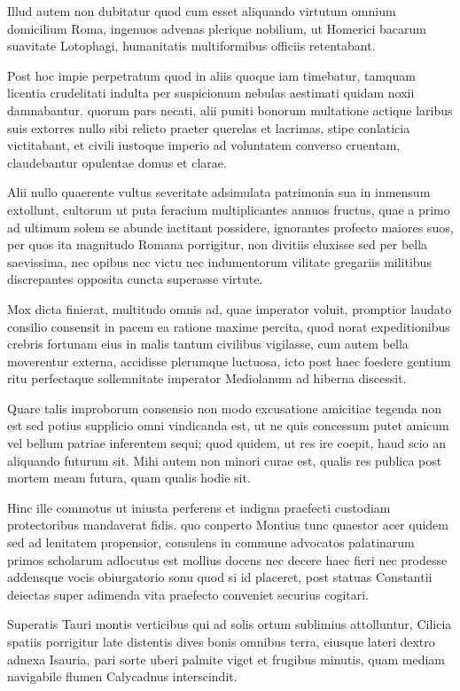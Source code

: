 \documentclass[12pt]{book}
\begin{document}
Illud autem non dubitatur quod cum esset aliquando virtutum omnium domicilium Roma, ingenuos advenas plerique nobilium, ut Homerici bacarum suavitate Lotophagi, humanitatis multiformibus officiis retentabant.

Post hoc impie perpetratum quod in aliis quoque iam timebatur, tamquam licentia crudelitati indulta per suspicionum nebulas aestimati quidam noxii damnabantur. quorum pars necati, alii puniti bonorum multatione actique laribus suis extorres nullo sibi relicto praeter querelas et lacrimas, stipe conlaticia victitabant, et civili iustoque imperio ad voluntatem converso cruentam, claudebantur opulentae domus et clarae.

Alii nullo quaerente vultus severitate adsimulata patrimonia sua in inmensum extollunt, cultorum ut puta feracium multiplicantes annuos fructus, quae a primo ad ultimum solem se abunde iactitant possidere, ignorantes profecto maiores suos, per quos ita magnitudo Romana porrigitur, non divitiis eluxisse sed per bella saevissima, nec opibus nec victu nec indumentorum vilitate gregariis militibus discrepantes opposita cuncta superasse virtute.

Mox dicta finierat, multitudo omnis ad, quae imperator voluit, promptior laudato consilio consensit in pacem ea ratione maxime percita, quod norat expeditionibus crebris fortunam eius in malis tantum civilibus vigilasse, cum autem bella moverentur externa, accidisse plerumque luctuosa, icto post haec foedere gentium ritu perfectaque sollemnitate imperator Mediolanum ad hiberna discessit.

Quare talis improborum consensio non modo excusatione amicitiae tegenda non est sed potius supplicio omni vindicanda est, ut ne quis concessum putet amicum vel bellum patriae inferentem sequi; quod quidem, ut res ire coepit, haud scio an aliquando futurum sit. Mihi autem non minori curae est, qualis res publica post mortem meam futura, quam qualis hodie sit.

Hinc ille commotus ut iniusta perferens et indigna praefecti custodiam protectoribus mandaverat fidis. quo conperto Montius tunc quaestor acer quidem sed ad lenitatem propensior, consulens in commune advocatos palatinarum primos scholarum adlocutus est mollius docens nec decere haec fieri nec prodesse addensque vocis obiurgatorio sonu quod si id placeret, post statuas Constantii deiectas super adimenda vita praefecto conveniet securius cogitari.

Superatis Tauri montis verticibus qui ad solis ortum sublimius attolluntur, Cilicia spatiis porrigitur late distentis dives bonis omnibus terra, eiusque lateri dextro adnexa Isauria, pari sorte uberi palmite viget et frugibus minutis, quam mediam navigabile flumen Calycadnus interscindit.
\end{document}
